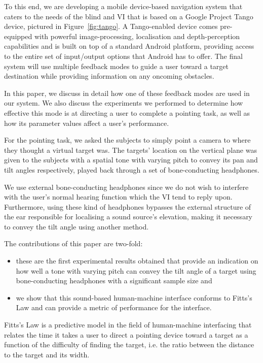 \documentclass[format=sigconf, review=true, screen=true, anonymous=true]{acmart}
\begin{document}
To this end, we are developing a mobile device-based navigation system that caters to the needs of the blind and VI that is based on a Google Project Tango device, pictured in Figure~\ref{fig:tango}. A Tango-enabled device comes pre-equipped with powerful image-processing, localisation and depth-perception capabilities and is built on top of a standard Android platform, providing access to the entire set of input/output options that Android has to offer. The final system will use multiple feedback modes to guide a user toward a target destination while providing information on any oncoming obstacles.

In this paper, we discuss in detail how one of these feedback modes are used in our system. We also discuss the experiments we performed to determine how effective this mode is at directing a user to complete a pointing task, as well as how its parameter values affect a user's performance. 

For the pointing task, we asked the subjects to simply point a camera to where they thought a virtual target was. The targets' location on the vertical plane was given to the subjects with a spatial tone with varying pitch to convey its pan and tilt angles respectively, played back through a set of bone-conducting headphones. 

We use external bone-conducting headphones since we do not wish to interfere with the user's normal hearing function which the VI tend to reply upon. Furthermore, using these kind of headphones bypasses the external structure of the ear responsible for localising a sound source's elevation, making it necessary to convey the tilt angle using another method. 

The contributions of this paper are two-fold: 

\begin{itemize}
  \item these are the first experimental results obtained that provide an indication on how well a tone with varying pitch can convey the tilt angle of a target using bone-conducting headphones with a significant sample size and 
  \item we show that this sound-based human-machine interface conforms to Fitts's Law and can provide a metric of performance for the interface.
\end{itemize}

Fitts's Law is a predictive model in the field of human-machine interfacing that relates the time it takes a user to direct a pointing device toward a target as a function of the difficulty of finding the target, i.e. the ratio between the distance to the target and its width. 
\end{document}
